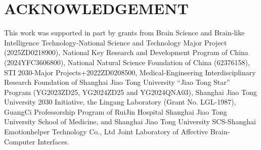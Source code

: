 \documentclass{article}
\begin{document}
\vfill\pagebreak


\section{ACKNOWLEDGEMENT}
This work was supported in part by grants from Brain Science and Brain-like Intelligence Technology-National Science and Technology Major Project (2025ZD0218900), National Key Research and Development Program of China (2024YFC3606800), National Natural Science Foundation of China (62376158), STI 2030-Major Projects+2022ZD0208500, Medical-Engineering Interdisciplinary Research Foundation of Shanghai Jiao Tong University “Jiao Tong Star” Program (YG2023ZD25, YG2024ZD25 and YG2024QNA03), Shanghai Jiao Tong University 2030 Initiative, the Lingang Laboratory (Grant No. LGL-1987), GuangCi Professorship Program of RuiJin Hospital Shanghai Jiao Tong University School of Medicine, and Shanghai Jiao Tong University SCS-Shanghai Emotionhelper Technology Co., Ltd Joint Laboratory of Affective Brain-Computer Interfaces.



\end{document}
